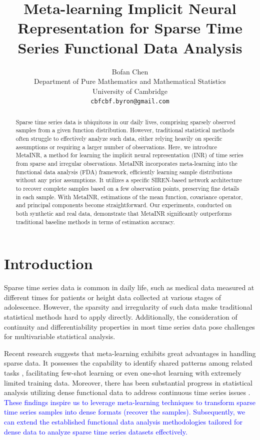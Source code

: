 \documentclass{article}
\title{Meta-learning Implicit Neural Representation for Sparse Time Series Functional Data Analysis}
\author{%
  Bofan Chen\\
  Department of Pure Mathematics and Mathematical Statistics\\
  University of Cambridge\\
  \texttt{cbfcbf.byron@gmail.com} \\}
\begin{document}
\maketitle

\begin{abstract}
  Sparse time series data is ubiquitous in our daily lives, comprising sparsely observed samples from a given function distribution.
  However, traditional statistical methods often struggle to effectively analyze such data, either relying heavily on specific assumptions or requiring a larger number of observations.  Here, we introduce MetaINR, a method for learning the implicit neural representation (INR) of time series from sparse and irregular observations.
  MetaINR incorporates meta-learning into the functional data analysis (FDA) framework, 
  efficiently learning sample distributions without any prior assumptions.
  It utilizes a specific SIREN-based network architecture to recover complete samples based on a few observation points, preserving fine details in each sample. 
  With MetaINR, estimations of the mean function, covariance operator, and principal components become straightforward.
  Our experiments, conducted on both synthetic and real data, demonstrate that MetaINR significantly outperforms traditional baseline methods in terms of estimation accuracy.
\end{abstract}

\section{Introduction}
Sparse time series data is common in daily life, such as medical data measured at different times for patients or height data collected at various stages of adolescence. 
However, the sparsity and irregularity of such data make traditional statistical methods hard to apply directly. 
Additionally, the consideration of continuity and differentiability properties in most time series data pose challenges for multivariable statistical analysis.

Recent research suggests that meta-learning \cite{finn2017model,hospedales2021meta,beck2023survey} exhibits great advantages in handling sparse data. 
It possesses the capability to identify shared patterns among related tasks \cite{raghu2019rapid}, 
facilitating few-shot learning or even one-shot learning \cite{sun2019meta} with extremely limited training data. 
Moreover, there has been substantial progress in statistical analysis utilizing dense functional data to address continuous time series issues \cite{wang2016functional}. 
\textcolor{blue}{These findings inspire us to leverage meta-learning techniques to transform sparse time series samples into dense formats (recover the samples).
Subsequently, we can extend the established functional data analysis methodologies tailored for dense data to analyze sparse time series datasets effectively.
}
\end{document}
